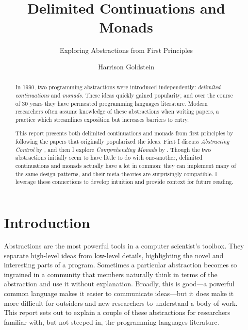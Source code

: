 \documentclass[acmsmall, nonacm, screen]{acmart}
\begin{document}
\title{Delimited Continuations and Monads}
\subtitle{Exploring Abstractions from First Principles}

\author{Harrison Goldstein}

\renewcommand{\shortauthors}{Goldstein}

\begin{abstract}
  In 1990, two programming abstractions were introduced independently: {\em delimited
  continuations} and {\em monads}. These ideas quickly gained popularity, and over the course of
  30 years they have permeated programming languages literature. Modern researchers often assume
  knowledge of these abstractions when writing papers, a practice which streamlines exposition
  but increases barriers to entry.
  
  This report presents both delimited continuations and monads from first principles by following
  the papers that originally popularized the ideas. First I discuss {\em Abstracting Control} by
  \citet{danvy1990abstracting}, and then I explore {\em Comprehending Monads} by
  \citet{wadler1990comprehending}. Though the two abstractions initially seem to have little to
  do with one-another, delimited continuations and monads actually have a lot in common: they can
  implement many of the same design patterns, and their meta-theories are surprisingly
  compatible. I leverage these connections to develop intuition and provide context for future
  reading.
\end{abstract}

\maketitle

\section{Introduction} \label{sec:introduction}
Abstractions are the most powerful tools in a computer scientist's toolbox. They separate
high-level ideas from low-level details, highlighting the novel and interesting parts of a
program. Sometimes a particular abstraction becomes so ingrained in a community that members
naturally think in terms of the abstraction and use it without explanation. Broadly, this is
good---a powerful common language makes it easier to communicate ideas---but it does make it more
difficult for outsiders and new researchers to understand a body of work. This report sets out to
explain a couple of these abstractions for researchers familiar with, but not steeped in, the
programming languages literature.
\end{document}
